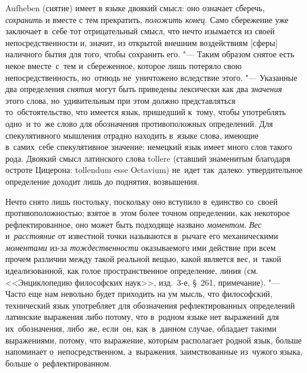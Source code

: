 Aufheben (снятие) имеет в языке двоякий смысл: оно означает сберечь,
{\em сохранить} и вместе с тем прекратить, {\em положить конец}. Само
сбережение уже заключает в~себе тот отрицательный смысл, что нечто изымается из
своей непосредственности и, значит, из открытой внешним воздействиям [сферы]
наличного бытия для того, чтобы сохранить его. "--- Таким образом снятое есть
некое вместе~с~тем и~сбереженное, которое лишь потеряло свою
непосредственность, но~отнюдь не~уничтожено вследствие этого. "--- Указанные
два определения {\em снятия} могут быть приведены лексически как два {\em
значения} этого слова, но~удивительным при этом должно представляться
то~обстоятельство, что имеется язык, пришедший к~тому, чтобы употреблять одно~и
то~же слово для обозначения противоположных определений. Для спекулятивного
мышления отрадно находить в~языке слова, имеющие в~самих~себе спекулятивное
значение; немецкий язык имеет много слов такого рода. Двоякий смысл латинского
слова tollere (ставший знаменитым благодаря остроте Цицерона: tollendum esse
Octavium) не~идет
так~далеко: утвердительное определение доходит лишь до поднятия, возвышения.

Нечто снято лишь постольку, поскольку оно вступило в~единство со~своей
противоположностью; взятое в~этом более точном определении, как некоторое
рефлектированное, оно может быть подходяще названо {\em моментом}. {\em Вес}
и~{\em расстояние} от известной точки называются в~рычаге его механическими
{\em моментами} из-за {\em тождественности} оказываемого ими действие при всем
прочем различии между такой реальной вещью, какой является вес, и~такой
идеализованной, как голое пространственное определение, линия (см.
<<Энциклопедию философских наук>>, изд.~3-е, \S~261, примечание). "--- Часто
еще нам невольно будет приходить на ум мысль, что философский, технический язык
употребляет для обозначения рефлектированных определений латинские
выражения либо потому, что в~родном языке нет выражений
для их~обозначения, либо~же, если~он, как~в~данном случае, обладает такими
выражениями, потому, что выражение, которым располагает родной язык, больше
напоминает о~непосредственном, а~выражения, заимствованные из~чужого языка,
больше о~рефлектированном.

